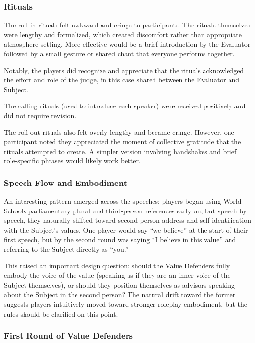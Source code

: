 \subsubsection{Rituals}

The roll-in rituals felt awkward and cringe to participants. The rituals themselves were lengthy and formalized, which created discomfort rather than appropriate atmosphere-setting. More effective would be a brief introduction by the Evaluator followed by a small gesture or shared chant that everyone performs together.

Notably, the players did recognize and appreciate that the rituals acknowledged the effort and role of the judge, in this case shared between the Evaluator and Subject.

The calling rituals (used to introduce each speaker) were received positively and did not require revision.

The roll-out rituals also felt overly lengthy and became cringe. However, one participant noted they appreciated the moment of collective gratitude that the rituals attempted to create. A simpler version involving handshakes and brief role-specific phrases would likely work better.

\subsubsection{Speech Flow and Embodiment}

An interesting pattern emerged across the speeches: players began using World Schools parliamentary plural and third-person references early on, but speech by speech, they naturally shifted toward second-person address and self-identification with the Subject's values. One player would say ``we believe'' at the start of their first speech, but by the second round was saying ``I believe in this value'' and referring to the Subject directly as ``you.''

This raised an important design question: should the Value Defenders fully embody the voice of the value (speaking as if they are an inner voice of the Subject themselves), or should they position themselves as advisors speaking about the Subject in the second person? The natural drift toward the former suggests players intuitively moved toward stronger roleplay embodiment, but the rules should be clarified on this point.

\subsubsection{First Round of Value Defenders}

